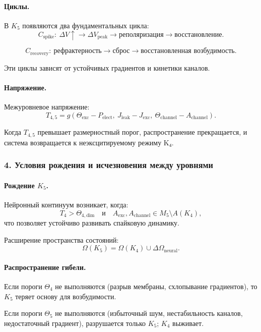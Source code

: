 \paragraph{Циклы.}
В $K_5$ появляются два фундаментальных цикла:
\[
C_{\mathrm{spike}}:\ \Delta V \uparrow \rightarrow \Delta V_{\mathrm{peak}}
\rightarrow \text{реполяризация} \rightarrow \text{восстановление}.
\]

\[
C_{\mathrm{recovery}}:\ \text{рефрактерность} \rightarrow \text{сброс}
\rightarrow \text{восстановленная возбудимость}.
\]

Эти циклы зависят от устойчивых градиентов и кинетики каналов.

\paragraph{Напряжение.}
Межуровневое напряжение:
\[
T_{4,5} =
g(\Theta_{\mathrm{exc}} - P_{\mathrm{elect}},\
  J_{\mathrm{leak}} - J_{\mathrm{exc}},\
  \Theta_{\mathrm{channel}} - A_{\mathrm{channel}}).
\]

Когда $T_{4,5}$ превышает размерностный порог, распространение прекращается,
и система возвращается к неэксцитируемому режиму K₄.

\subsubsection{4. Условия рождения и исчезновения между уровнями}

\paragraph{Рождение \texorpdfstring{$K_5$}{K_5}.}
Нейронный континуум возникает, когда:
\[
T_4 > \Theta_{4,\mathrm{dim}}
\quad\text{и}\quad
A_{\mathrm{exc}}, A_{\mathrm{channel}} \in M_5 \setminus A(K_4),
\]
что позволяет устойчиво развивать спайковую динамику.

Расширение пространства состояний:
\[
\Omega(K_5) = \Omega(K_4) \cup \Delta\Omega_{\mathrm{neural}}.
\]

\paragraph{Распространение гибели.}
Если пороги $\Theta_4$ не выполняются (разрыв мембраны, схлопывание градиентов),
то $K_5$ теряет основу для возбудимости.

Если пороги $\Theta_5$ не выполняются (избыточный шум, нестабильность каналов,
недостаточный градиент), разрушается только $K_5$; $K_4$ выживает.

